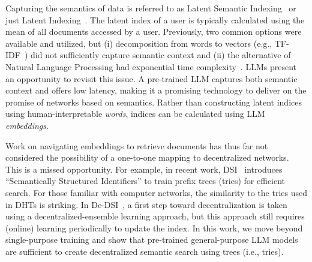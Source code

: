 \documentclass[10pt,journal]{IEEEtran}
\newcommand{\todo}[1]{\textcolor{red}{\textbf{[TODO: #1]}}}
\begin{document}
Capturing the semantics of data is referred to as Latent Semantic Indexing~\cite{dumais1988using} or just Latent Indexing~\cite{salakhutdinov2009semantic}.
The latent index of a user is typically calculated using the mean of all documents accessed by a user.
Previously, %
two common options were available and utilized, %
but (i) decomposition from words to vectors (e.g., TF-IDF~\cite{tang2003peer}) did not sufficiently capture semantic context and (ii) the alternative of Natural Language Processing had exponential time complexity~\cite{berger1996maximum}.
LLMs present an opportunity to revisit this issue.
A pre-trained LLM captures both semantic context and offers low latency, making it a promising technology to deliver on the promise of networks based on semantics.
Rather than constructing latent indices using human-interpretable \textit{words}, indices can be calculated using LLM \textit{embeddings}.



Work on navigating embeddings to retrieve documents has thus far not considered the possibility of a one-to-one mapping to decentralized networks.
This is a missed opportunity.
For example, in recent work, DSI~\cite{tay2022transformer} introduces ``Semantically Structured Identifiers'' to train prefix trees (tries) for efficient search.
For those familiar with computer networks, the similarity to the tries used in DHTs is striking.
In De-DSI~\cite{neague2024dsi}, a first step toward decentralization is taken using a decentralized-ensemble learning approach, but this approach still requires (online) learning periodically to update the index.
In this work, we move beyond single-purpose training and show that pre-trained general-purpose LLM models are sufficient to create decentralized semantic search using trees (i.e., tries).
\end{document}
